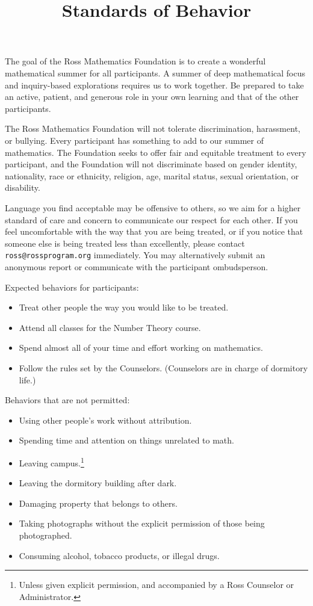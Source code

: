 \documentclass{ross}
\title{Standards of Behavior}
\makeatletter
\newcommand\footnoteref[1]{\protected@xdef\@thefnmark{\ref{#1}}\@footnotemark}
\makeatother
\begin{document}
\maketitle

The goal of the Ross Mathematics Foundation is to create a wonderful
mathematical summer for all participants.  A summer of deep
mathematical focus and inquiry-based explorations requires us to work
together.  Be prepared to take an active, patient, and generous role
in your own learning and that of the other participants.

The Ross Mathematics Foundation will not tolerate discrimination,
harassment, or bullying.  Every participant has something to add to
our summer of mathematics.  The Foundation seeks to offer fair and
equitable treatment to every participant, and the Foundation will not
discriminate based on gender identity, nationality, race or ethnicity,
religion, age, marital status, sexual orientation, or disability.

Language you find acceptable may be offensive to others, so we aim for
a higher standard of care and concern to communicate our respect for
each other.  If you feel uncomfortable with the way that you are being
treated, or if you notice that someone else is being treated less than
excellently, please contact \texttt{ross@rossprogram.org} immediately.
You may alternatively submit an anonymous report or communicate with
the participant ombudsperson.

Expected behaviors for participants:
\begin{itemize}
\item Treat other people the way you would like to be treated.
\item Attend all classes for the Number Theory course.
\item Spend almost all of your time and effort working on mathematics.
\item Follow the rules set by the Counselors. (Counselors are in charge of dormitory life.)
\end{itemize}

Behaviors that are not permitted:
\begin{itemize}
\item Using other people's work without attribution.
\item Spending time and attention on things unrelated to math.
\item Leaving campus.\footnote{\label{counselors}Unless given explicit permission, and accompanied by a Ross Counselor or Administrator.}
\item Leaving the dormitory building after dark.\footnoteref{counselors}
\item Damaging property that belongs to others.
\item Taking photographs without the explicit permission of those being photographed.
\item Consuming alcohol, tobacco products, or illegal drugs.
\end{itemize}
\end{document}
